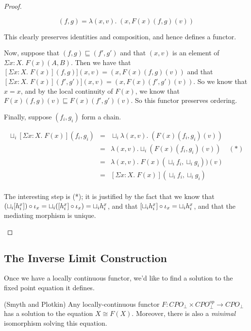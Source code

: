 \begin{proof}
\begin{enumerate}
\begin{displaymath}
  [\Sigma x:X.\; F(x)](f,g) = \lambda (x, v).\; (x, F(x)(f,g)(v))
\end{displaymath}

This clearly preserves identities and composition, and hence defines
a functor. 

Now, suppose that $(f,g) \sqsubseteq (f',g')$ and that $(x,v)$ is
an element of $\Sigma x:X.\; F(x)(A,B)$. Then we have that
$[\Sigma x:X.\;F(x)](f,g)](x,v) = (x,F(x)(f,g)(v))$ and that
$[\Sigma x:X.\;F(x)](f',g')](x,v) = (x,F(x)(f',g')(v))$. So we
know that $x=x$, and by the local continuity of $F(x)$, we know
that $F(x)(f,g)(v) \sqsubseteq F(x)(f',g')(v)$. So this functor
preserves ordering. 

Finally, suppose $(f_i, g_i)$ form a chain. 

\begin{displaymath}
\begin{array}{lcl}
\sqcup_i [\Sigma x:X.\;F(x)](f_i,g_i) 
& = & \sqcup_i \lambda (x,v).\; (F(x)(f_i,g_i)(v)) \\
& = & \lambda (x,v). \sqcup_i (F(x)(f_i,g_i)(v)) \;\;\;\; (*) \\
& = & \lambda (x,v).\; F(x)(\sqcup_i f_i, \sqcup_i g_i))(v) \\
& = & [\Sigma x:X.\;F(x)](\sqcup_i f_i, \sqcup_i g_i) \\
\end{array}
\end{displaymath}

The interesting step is (*); it is justified by the fact
that we know that 
$(\sqcup_i [h^x_i]) \circ \iota_{x} =  
\sqcup_i ([h^x_i] \circ \iota_{x}) =  \sqcup_i h^x_i$, 
and that $[\sqcup_i h^x_i] \circ \iota_{x} = \sqcup_i h^x_i$, 
and that the mediating morphism is unique.
\end{enumerate}
\end{proof}

\subsection{The Inverse Limit Construction}

Once we have a locally continuous functor, we'd like to find a
solution to the fixed point equation it defines.

\begin{prop}{(Smyth and Plotkin)}
Any locally-continuous functor $F : CPO_\bot \times CPO^{op}_\bot \to
CPO_\bot$ has a solution to the equation $X \cong F(X)$. Moreover, there
is also a \emph{minimal} isomorphism solving this equation. 
\end{prop}

